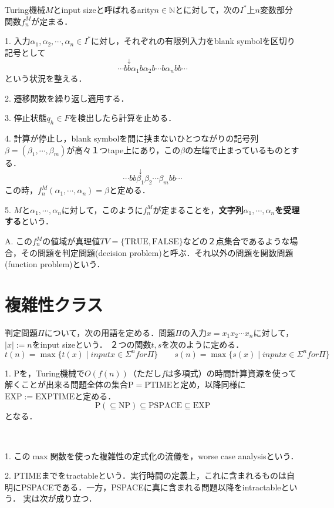 \documentclass[uplatex, 12pt, dvipdfmx]{jsreport}
\begin{document}
\begin{screen}\begin{definition}[部分関数への翻訳埋め込み]
    Turing機械$M$とinput sizeと呼ばれるarity$n\in\mathbb{N}$とに対して，次の$I^*$上$n$変数部分関数$f^M_n$が定まる．

    1. 入力$\alpha_1,\alpha_2,\cdots,\alpha_n\in I^*$に対し，それぞれの有限列入力をblank symbolを区切り記号として
    \[ \cdots b\overset{\downarrow}{b}\alpha_1b\alpha_2b\cdots b\alpha_nbb\cdots \]
    という状況を整える．

    2. 遷移関数を繰り返し適用する．

    3. 停止状態$q_h\in F$を検出したら計算を止める．

    4. 計算が停止し，blank symbolを間に挟まないひとつながりの記号列$\beta=(\beta_1,\cdots,\beta_m)$が高々１つtape上にあり，この$\beta$の左端で止まっているものとする．
    \[ \cdots bb\overset{\downarrow}{\beta_1}\beta_2\cdots\beta_mbb\cdots \]
    この時，$f^M_n(\alpha_1,\cdots,\alpha_n)=\beta$と定める．

    5. $M$と$\alpha_1,\cdots,\alpha_n$に対して，このように$f^M_n$が定まることを，\textbf{文字列$\alpha_1,\cdots,\alpha_n$を受理する}という．

    A. この$f^M_n$の値域が真理値$TV=\{\mathrm{TRUE, FALSE}\}$などの２点集合であるような場合，その問題を判定問題(decision problem)と呼ぶ．それ以外の問題を関数問題(function problem)という．
\end{definition}\end{screen}

\section{複雑性クラス}

\begin{definition}
    判定問題$\Pi$について，次の用語を定める．問題$\Pi$の入力$x=x_1x_2\cdots x_n$に対して，$|x|:=n$をinput sizeという．
    ２つの関数$t,s$を次のように定める．
    \[ t(n)=\max\{t(x)\mid input x\in\Sigma^n for\Pi\} \hspace{2em}
    s(n)=\max\{s(x)\mid input x\in\Sigma^n for\Pi\} \]

    1. $\mathrm{P}$を，Turing機械で$O(f(n))$（ただし$f$は多項式）の時間計算資源を使って解くことが出来る問題全体の集合$\mathrm{P}=\mathrm{PTIME}$と定め，以降同様に$\mathrm{EXP}:=\mathrm{EXPTIME}$と定める．
    \[\mathrm{P}(\subseteq\mathrm{NP})\subseteq\mathrm{PSPACE}\subseteq\mathrm{EXP}\]
    となる．
\end{definition}
\begin{remark}　
    
    1. この$\max$関数を使った複雑性の定式化の流儀を，worse case analysisという．

    2. PTIMEまでをtractableという．実行時間の定義上，これに含まれるものは自明にPSPACEである．一方，PSPACEに真に含まれる問題以降をintractableという．
    実は次が成り立つ．
\end{remark}
\end{document}

